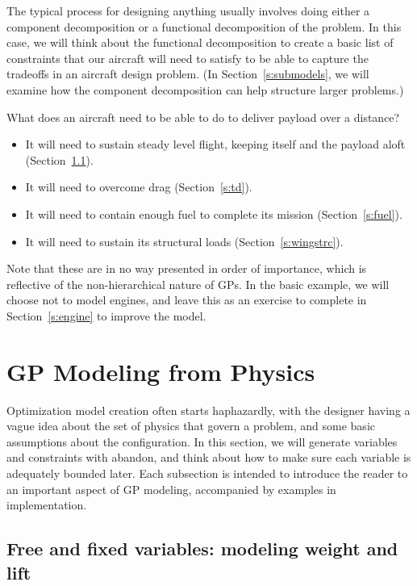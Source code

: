 The typical process for designing anything usually involves doing either a
component decomposition or a functional decomposition of the problem. In
this case, we will think about the functional decomposition to create a
basic list of constraints that our aircraft will need to satisfy to be
able to capture the tradeoffs in an aircraft design problem. (In
Section~\ref{s:submodels}, we will examine how
the component decomposition
can help structure larger problems.)

What does an aircraft need to be able to do to deliver payload over a distance?
\begin{itemize}
	\item It will need to sustain steady
    level flight, keeping itself and the payload aloft (Section~\ref{s:wl}).
    \item It will need to overcome drag (Section~\ref{s:td}).
	\item It will need to contain enough fuel to complete its mission
        (Section~\ref{s:fuel}).
	\item It will need to sustain its structural loads (Section~\ref{s:wingstrc}).
\end{itemize}

Note that these are in no way presented in order of importance, which is reflective
of the non-hierarchical nature of \gls{GP}s.
In the basic example, we will choose not to model engines,
and leave this as an exercise
to complete in Section~\ref{s:engine} to improve the model.

\section{GP Modeling from Physics}

Optimization model creation often starts haphazardly, with the designer having a
vague idea about the set of physics that govern a problem, and some basic
assumptions about the configuration. In this section, we will
generate variables and constraints with abandon, and think about how to make
sure each variable is adequately bounded later. Each subsection is intended
to introduce the reader to an important aspect of \gls{GP} modeling,
accompanied by examples in implementation.

\subsection{Free and fixed variables: modeling weight and lift}
\label{s:wl}

